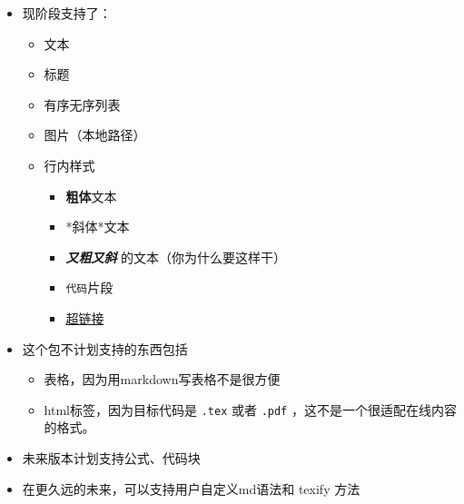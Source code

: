 \documentclass{ctexart}
\begin{document}
	\begin{itemize}
		\item 现阶段支持了：
		\begin{itemize}
			\item 文本
			\item 标题
			\item 有序无序列表
			\item 图片（本地路径）
			\item 行内样式
			\begin{itemize}
				\item \textbf{粗体}文本
				\item *斜体*文本
				\item \textbf{\textit{又粗又斜}} 的文本（你为什么要这样干）
				\item \texttt{代码}片段
				\item \href{https://http.cat/404}{超链接}
			\end{itemize}
		\end{itemize}
		\item 这个包不计划支持的东西包括
		\begin{itemize}
			\item 表格，因为用markdown写表格不是很方便
			\item html标签，因为目标代码是 \texttt{.tex} 或者 \texttt{.pdf} ，这不是一个很适配在线内容的格式。
		\end{itemize}
		\item 未来版本计划支持公式、代码块
		\item 在更久远的未来，可以支持用户自定义md语法和 texify 方法
	\end{itemize}
\end{document}
